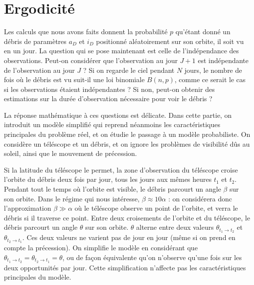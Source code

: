 \documentclass[11pt,a4paper,reqno]{amsart}
\begin{document}
\section{Ergodicité}
Les calculs que nous avons faits donnent la probabilité $p$ qu'étant
donné un débris de paramètres $a_{D}$ et $i_{D}$ positionné
aléatoirement sur son orbite, il soit vu en un jour. La question qui
se pose maintenant est celle de l'indépendance des
observations. Peut-on considérer que l'observation au jour $J+1$ est
indépendante de l'observation au jour $J$ ? Si on regarde le ciel
pendant $N$ jours, le nombre de fois où le débris est vu suit-il une
loi binomiale $B(n,p)$, comme ce serait le cas si les observations
étaient indépendantes ? Si non, peut-on obtenir des estimations sur la
durée d'observation nécessaire pour voir le débris ?

La réponse mathématique à ces questions est délicate. Dans cette
partie, on introduit un modèle simplifié qui reprend néanmoins les
caractéristiques principales du problème réel, et on étudie le passage
à un modèle probabiliste. On considère un téléscope et un débris, et
on ignore les problèmes de visibilité dûs au soleil, ainsi que le
mouvement de précession.

Si la latitude du téléscope le permet, la zone d'observation du
téléscope croise l'orbite du débris deux fois par jour, tous les jours
aux mêmes heures $t_{1}$ et $t_{2}$. Pendant tout le temps où l'orbite
est visible, le débris parcourt un angle $\beta$ sur son orbite. Dans
le régime qui nous intéresse, $\beta \approx 10 \alpha$ : on
considérera donc l'approximation $\beta \gg \alpha$ où le téléscope
observe un point de l'orbite, et verra le débris si il traverse ce
point. Entre deux croisements de l'orbite et du téléscope, le débris
parcourt un angle $\theta$ sur son orbite. $\theta$ alterne entre deux
valeurs $\theta_{t_{1} \to t_{2}}$ et $\theta_{t_{2} \to t_{1}}$. Ces
deux valeurs ne varient pas de jour en jour (même si on prend en
compte la précession). On simplifie le modèle en considérant que
$\theta_{t_{1} \to t_{2}} = \theta_{t_{2} \to t_{1}} = \theta$, ou de
façon équivalente qu'on n'observe qu'une fois sur les deux
opportunités par jour. Cette simplification n'affecte pas les
caractéristiques principales du modèle.

%   
%   
  
\end{document}
